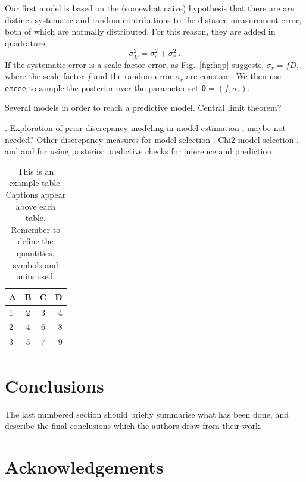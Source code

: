 \documentclass[a4paper,fleqn,usenatbib]{mnras}
\begin{document}

Our first model is based on the (somewhat naive) hypothesis that there are are distinct systematic and random contributions to the distance measurement error, both of which are normally distributed. For this reason, they are added in quadrature, 
\[\sigma_D^2=\sigma_s^2+\sigma_r^2\ .\]
If the systematic error is a scale factor error, as Fig.~\ref{fig:hqp} suggests, $\sigma_r=fD$, where the scale factor $f$ and the random error $\sigma_r$ are constant. We then use \texttt{emcee} to sample the posterior over the parameter set $\pmb{\theta}=(f,\sigma_r)$.

Several models in order to reach a predictive model. Central limit theorem?

   \citet{brooks}. Exploration of prior discrepancy modeling in model estimation \citet{priordisc}, maybe not needed?
Other discrepancy measures for model selection \citet{otherdisc}. Chi2 model selection \citet{chi2ms}. \citet{gelman2003} and \citet{ppcinf} and for using posterior predictive checks for inference and prediction






\begin{table}
	\centering
	\caption{This is an example table. Captions appear above each table.
	Remember to define the quantities, symbols and units used.}
	\label{tab:example_table}
	\begin{tabular}{lccr} %
		\hline
		A & B & C & D\\
		\hline
		1 & 2 & 3 & 4\\
		2 & 4 & 6 & 8\\
		3 & 5 & 7 & 9\\
		\hline
	\end{tabular}
\end{table}


\section{Conclusions}

The last numbered section should briefly summarise what has been done, and describe
the final conclusions which the authors draw from their work.

\section*{Acknowledgements}
\end{document}
